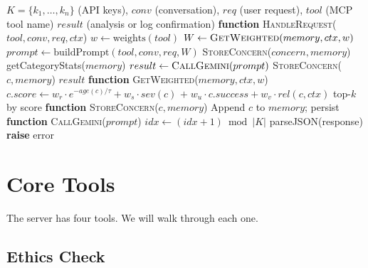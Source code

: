 \documentclass[conference]{IEEEtran}
\begin{document}
\begin{algorithm}[htbp]
\caption{Neutralis-AI: MCP-Based Ethical Oversight}
\label{alg:neutralis}
\begin{algorithmic}[1]
\renewcommand{\algorithmicrequire}{\textbf{Input:}}
\renewcommand{\algorithmicensure}{\textbf{Output:}}
\REQUIRE $K = \{k_1, \ldots, k_n\}$ (API keys), $conv$ (conversation),
\REQUIRE $req$ (user request), $tool$ (MCP tool name)
\ENSURE $result$ (analysis or log confirmation)
\STATE
\STATE \textbf{function} \textsc{HandleRequest}($tool, conv, req, ctx$)
\STATE $w \leftarrow \text{weights}(tool)$ 
\STATE $W \leftarrow \text{\textsc{GetWeighted}}(memory, ctx, w)$
\STATE $prompt \leftarrow \text{buildPrompt}(tool, conv, req, W)$
    \STATE \textsc{StoreConcern}($concern, memory$)
    \RETURN getCategoryStats($memory$)
\ENDIF
\STATE $result \leftarrow \text{\textsc{CallGemini}}(prompt)$
        \STATE \textsc{StoreConcern}($c, memory$)
    \ENDFOR
\ENDIF
\RETURN $result$
\STATE
\STATE \textbf{function} \textsc{GetWeighted}($memory, ctx, w$)
    \STATE $c.score \leftarrow w_r \cdot e^{-age(c)/\tau} + w_s \cdot sev(c)$
    \STATE \hspace{\algorithmicindent} $+ \; w_u \cdot c.success + w_v \cdot rel(c, ctx)$
\ENDFOR
\RETURN top-$k$ by score
\STATE
\STATE \textbf{function} \textsc{StoreConcern}($c, memory$)
    \RETURN {}
\ENDIF
\STATE Append $c$ to $memory$; persist
\STATE
\STATE \textbf{function} \textsc{CallGemini}($prompt$)
    \STATE $idx \leftarrow (idx + 1) \bmod |K|$
        \RETURN parseJSON(response)
    \ENDIF
\ENDFOR
\STATE \textbf{raise} error
\end{algorithmic}
\end{algorithm}

\section{Core Tools}

The server has four tools. We will walk through each one.

\subsection{Ethics Check}
\end{document}
